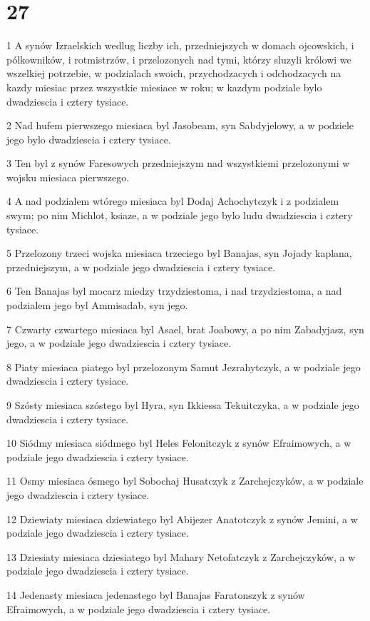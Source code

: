 \chapter{27}

\par 1 A synów Izraelskich wedlug liczby ich, przedniejszych w domach ojcowskich, i pólkowników, i rotmistrzów, i przelozonych nad tymi, którzy sluzyli królowi we wszelkiej potrzebie, w podzialach swoich, przychodzacych i odchodzacych na kazdy miesiac przez wszystkie miesiace w roku; w kazdym podziale bylo dwadziescia i cztery tysiace.
\par 2 Nad hufem pierwszego miesiaca byl Jasobeam, syn Sabdyjelowy, a w podziele jego bylo dwadziescia i cztery tysiace.
\par 3 Ten byl z synów Faresowych przedniejszym nad wszystkiemi przelozonymi w wojsku miesiaca pierwszego.
\par 4 A nad podzialem wtórego miesiaca byl Dodaj Achochytczyk i z podzialem swym; po nim Michlot, ksiaze, a w podziale jego bylo ludu dwadziescia i cztery tysiace.
\par 5 Przelozony trzeci wojska miesiaca trzeciego byl Banajas, syn Jojady kaplana, przedniejszym, a w podziale jego dwadziescia i cztery tysiace.
\par 6 Ten Banajas byl mocarz miedzy trzydziestoma, i nad trzydziestoma, a nad podzialem jego byl Ammisadab, syn jego.
\par 7 Czwarty czwartego miesiaca byl Asael, brat Joabowy, a po nim Zabadyjasz, syn jego, a w podziale jego dwadziescia i cztery tysiace.
\par 8 Piaty miesiaca piatego byl przelozonym Samut Jezrahytczyk, a w podziale jego dwadziescia i cztery tysiace.
\par 9 Szósty miesiaca szóstego byl Hyra, syn Ikkiessa Tekuitczyka, a w podziale jego dwadziescia i cztery tysiace.
\par 10 Siódmy miesiaca siódmego byl Heles Felonitczyk z synów Efraimowych, a w podziale jego dwadziescia i cztery tysiace.
\par 11 Osmy miesiaca ósmego byl Sobochaj Husatczyk z Zarchejczyków, a w podziale jego dwadziescia i cztery tysiace.
\par 12 Dziewiaty miesiaca dziewiatego byl Abijezer Anatotczyk z synów Jemini, a w podziale jego dwadziescia i cztery tysiace.
\par 13 Dziesiaty miesiaca dziesiatego byl Mahary Netofatczyk z Zarchejczyków, a w podziale jego dwadziescia i cztery tysiace.
\par 14 Jedenasty miesiaca jedenastego byl Banajas Faratonszyk z synów Efraimowych, a w podziale jego dwadziescia i cztery tysiace.
